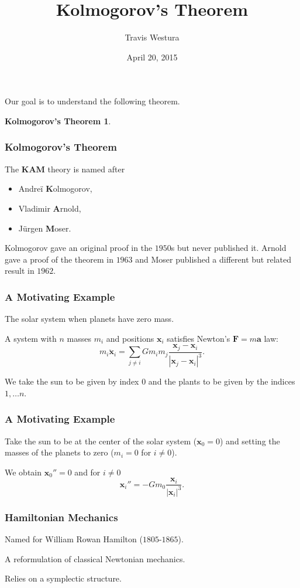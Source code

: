 \documentclass{beamer}
\title[KAM]{Kolmogorov's Theorem}
\author{Travis Westura}
\institute{Cornell University}
\date{April 20, 2015}
\newcommand{\bp}[1]{\bm{#1}}
\newcommand{\bdd}[1]{\bm{\ddot{#1}}}
\begin{document}
\frame{\titlepage}

\begin{frame}
  Our goal is to understand the following theorem.
  \newtheorem{kamthm}{Kolmogorov's Theorem}
  \begin{kamthm}
    \KAM
  \end{kamthm}
\end{frame}

\begin{frame}
  \frametitle{Kolmogorov's Theorem}
  The \textbf{KAM} theory is named after
  \begin{itemize}
    \item Andre{\"i} \textbf{K}olmogorov,
    \item Vladimir \textbf{A}rnold,
    \item J{\"u}rgen \textbf{M}oser.
  \end{itemize}
  Kolmogorov gave an original proof in the $1950$s but never published it.
  Arnold gave a proof of the theorem in $1963$ and Moser published a different
  but related result in $1962$.
\end{frame}

\begin{frame}
  \frametitle{A Motivating Example}
  The solar system when planets have zero mass.

  A system with $n$ masses $m_i$ and positions $\bp{x}_i$ satisfies Newton's
  $\bp{F} = m \bp{a}$ law:
  \begin{equation*}
    m_i \bdd{x}_i = \sum_{j \neq i} G m_i m_j \frac{\bp{x}_j -
      \bp{x}_i}{|\bp{x}_j - \bp{x}_i|^3}.
  \end{equation*}

  We take the sun to be given by index $0$ and the plants to be given by the
  indices $1, \ldots n$.
\end{frame}

\begin{frame}
  \frametitle{A Motivating Example}
  Take the sun to be at the center of the solar system ($\bp{x}_0 = 0$) and
  setting the masses of the planets to zero ($m_i = 0$ for $i \neq 0$).

  We obtain $\bp{x}_0'' = 0$ and for $i \neq 0$
  \begin{equation*}
    \bp{x}_i'' = -G m_0 \frac{\bp{x}_i}{|\bp{x}_i|^3}.
  \end{equation*}
\end{frame}

\begin{frame}
  \frametitle{Hamiltonian Mechanics}
  Named for William Rowan Hamilton ($1805$-$1865$).

  A reformulation of classical Newtonian mechanics.

  Relies on a symplectic structure.
\end{frame}
\end{document}
